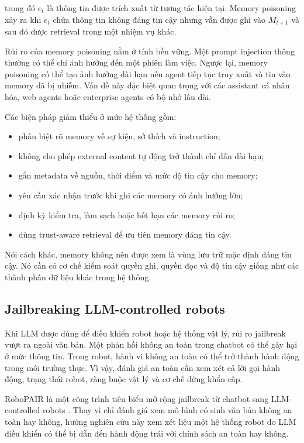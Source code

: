 trong đó $e_t$ là thông tin được trích xuất từ tương tác hiện tại. Memory
poisoning xảy ra khi $e_t$ chứa thông tin không đáng tin cậy nhưng vẫn được
ghi vào $M_{t+1}$ và sau đó được retrieval trong một nhiệm vụ khác.

Rủi ro của memory poisoning nằm ở tính bền vững. Một prompt injection thông
thường có thể chỉ ảnh hưởng đến một phiên làm việc. Ngược lại, memory
poisoning có thể tạo ảnh hưởng dài hạn nếu agent tiếp tục truy xuất và tin
vào memory đã bị nhiễm. Vấn đề này đặc biệt quan trọng với các assistant cá
nhân hóa, web agents hoặc enterprise agents có bộ nhớ lâu dài.

Các biện pháp giảm thiểu ở mức hệ thống gồm:

\begin{itemize}[leftmargin=1.2cm]
    \item phân biệt rõ memory về sự kiện, sở thích và instruction;
    \item không cho phép external content tự động trở thành chỉ dẫn dài hạn;
    \item gắn metadata về nguồn, thời điểm và mức độ tin cậy cho memory;
    \item yêu cầu xác nhận trước khi ghi các memory có ảnh hưởng lớn;
    \item định kỳ kiểm tra, làm sạch hoặc hết hạn các memory rủi ro;
    \item dùng trust-aware retrieval để ưu tiên memory đáng tin cậy.
\end{itemize}

Nói cách khác, memory không nên được xem là vùng lưu trữ mặc định đáng tin
cậy. Nó cần có cơ chế kiểm soát quyền ghi, quyền đọc và độ tin cậy giống
như các thành phần dữ liệu khác trong hệ thống.

\subsection{Jailbreaking LLM-controlled robots}
\label{subsec:llm-controlled-robots}

Khi LLM được dùng để điều khiển robot hoặc hệ thống vật lý, rủi ro
jailbreak vượt ra ngoài văn bản. Một phản hồi không an toàn trong chatbot
có thể gây hại ở mức thông tin. Trong robot, hành vi không an toàn có thể
trở thành hành động trong môi trường thực. Vì vậy, đánh giá an toàn cần
xem xét cả lời gọi hành động, trạng thái robot, ràng buộc vật lý và cơ chế
dừng khẩn cấp.

RoboPAIR là một công trình tiêu biểu mở rộng jailbreak từ chatbot sang
LLM-controlled robots \cite{robey2024robopair}. Thay vì chỉ đánh giá xem mô
hình có sinh văn bản không an toàn hay không, hướng nghiên cứu này xem xét
liệu một hệ thống robot do LLM điều khiển có thể bị dẫn đến hành động trái
với chính sách an toàn hay không.

